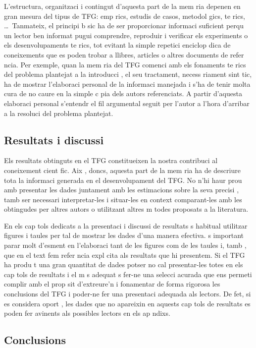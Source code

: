 L'estructura, organitzaci  i contingut d'aquesta part de la mem ria depenen en gran mesura del tipus de TFG: emp rics, estudis de casos, metodol gics, te rics, \ldots\ Tanmateix, el principi b sic ha de ser proporcionar informaci  suficient perqu  un lector ben informat pugui comprendre, reproduir i verificar els experiments o els desenvolupaments te rics, tot evitant la simple repetici  enciclop dica de coneixements que es poden trobar a llibres, articles o altres documents de refer ncia. Per exemple, quan la mem ria del TFG comenci amb els fonaments te rics del problema plantejat a la introducci , el seu tractament, necess riament sint tic, ha de mostrar l'elaboraci  personal de la informaci  manejada i s'ha de tenir molta cura de no caure en la simple c pia dels autors referenciats. A partir d'aquesta elaboraci  personal s'entendr  el fil argumental seguit per l'autor a l'hora d'arribar a la resoluci  del problema plantejat.

\subsection{Resultats i discussi }

Els resultats obtinguts en el TFG constitueixen la nostra contribuci  al coneixement cient fic. Aix , doncs, aquesta part de la mem ria ha de descriure tota la informaci  generada en el desenvolupament del TFG. No n'hi haur  prou amb presentar les dades juntament amb les estimacions sobre la seva precisi , tamb  ser  necessari interpretar-les i situar-les en context comparant-les amb les obtingudes per altres autors o utilitzant altres m todes proposats a la literatura.

En els cap tols dedicats a la presentaci  i discussi  de resultats  s habitual utilitzar figures i taules per tal de mostrar les dades d'una manera efectiva.  s important parar molt d'esment en l'elaboraci  tant de les figures com de les taules i, tamb , que en el text fem refer ncia expl cita als resultats que hi presentem. Si el TFG ha produ t una gran quantitat de dades potser no cal presentar-les totes en els cap tols de resultats i el m s adequat  s fer-ne una selecci  acurada que ens permeti complir amb el prop sit d'extreure'n i fonamentar de forma rigorosa les conclusions del TFG i poder-ne fer una presentaci  adequada als lectors. De fet, si es considera oport , les dades que no apareixin en aquests cap tols de resultats es poden fer avinents als possibles lectors en els ap ndixs.

\subsection{Conclusions}

